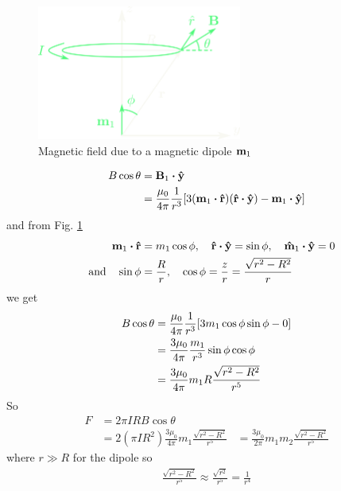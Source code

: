 \documentclass[../main.tex]{subfiles}
\begin{document}
\begin{itemize}
    \begin{figure}[ht]
        \centering
        \includegraphics[width=0.6\textwidth]{hw10_1.png}
        \caption{Magnetic field due to a magnetic dipole $\vb m_1$}
        \label{fig:hw10_1}
    \end{figure}
    \begin{align*}
        B \cos\theta &= \vb B_1 \vdot \vu y \\
        &= \frac{\mu_0}{4\pi} \frac{1}{r^3} \qt[
            3 (\vb m_1 \vdot \vu r) (\vu r \vdot \vu y) - \vb m_1 \vdot \vu y
        ] 
    \end{align*}
    and from Fig. \ref{fig:hw10_1}
    \begin{align*}
        \vb m_1 \vdot \vu r &= m_1 \cos\phi, \quad \vu r \vdot \vu y = \sin\phi,
        \quad \vu m_1 \vdot \vu y = 0 \\
        \qand \sin\phi & = \frac{R}{r}, \quad \cos\phi = \frac{z}{r} = \frac{\sqrt{r^2 - R^2}}{r}
    \end{align*}
    we get
    \begin{align*}
        B \cos\theta &= \frac{\mu_0}{4\pi} \frac{1}{r^3} \qt[
            3 m_1 \cos\phi \sin\phi - 0
        ] \\
        &= \frac{3 \mu_0}{4\pi} \frac{m_1}{r^3} \sin\phi \cos\phi \\
        &= \frac{3 \mu_0}{4\pi} m_1 R \frac{\sqrt{r^2 - R^2}}{r^5} \\
    \end{align*}
    So
    \begin{align*}
        F &= 2\pi I R B \cos\theta \\
        &= 2 (\pi I R^2) \frac{3 \mu_0}{4\pi} m_1 \frac{\sqrt{r^2 - R^2}}{r^5}
        &= \frac{3 \mu_0}{2\pi} m_1 m_2 \frac{\sqrt{r^2 - R^2}}{r^5}
    \end{align*}    
    where $r \gg R$ for the dipole so
    \begin{align*}
        \frac{\sqrt{r^2 - R^2}}{r^5} \approx \frac{\sqrt{r^2}}{r^5} = \frac{1}{r^4}

\end{align*}
\end{itemize}
\end{document}
